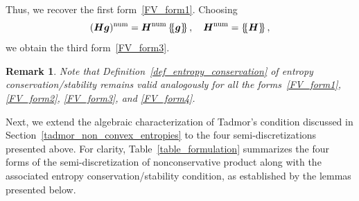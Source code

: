 \documentclass[]{scrartcl}
\newcommand*{\ldblbrace}{\{\mskip-5mu \left \{}
\newcommand*{\rdblbrace}{ \}\mskip-5mu \right \}}
\newcommand{\mean}[1]{\left\ldblbrace #1 \right\rdblbrace}
\renewcommand{\vec}[1]{\boldsymbol{#1}}
\newtheorem{remark}[theorem]{Remark}
\theoremstyle{definition}
\begin{document}
Thus, we recover the first form~\eqref{FV_form1}.
Choosing
\begin{equation}
    (\vec{H} \vec{g})^{\mathrm{num}} = \vec{H}^\mathrm{num} \mean{\vec{g}},
    \quad \vec{H}^{\mathrm{num}} = \mean{\vec{H}},
\end{equation}
we obtain the third form~\eqref{FV_form3}.
\begin{remark}
Note that Definition~\ref{def_entropy_conservation} of entropy conservation/stability remains valid analogously for all the forms~\eqref{FV_form1}, \eqref{FV_form2}, \eqref{FV_form3}, and \eqref{FV_form4}.
\end{remark}

Next, we extend the algebraic characterization of Tadmor's condition discussed in Section~\ref{tadmor_non_convex_entropies} to the four semi-discretizations presented above.
For clarity, Table~\ref{table_formulation} summarizes the four forms of the semi-discretization of nonconservative product along with the associated entropy conservation/stability condition, as established by the lemmas presented below.
\end{document}
